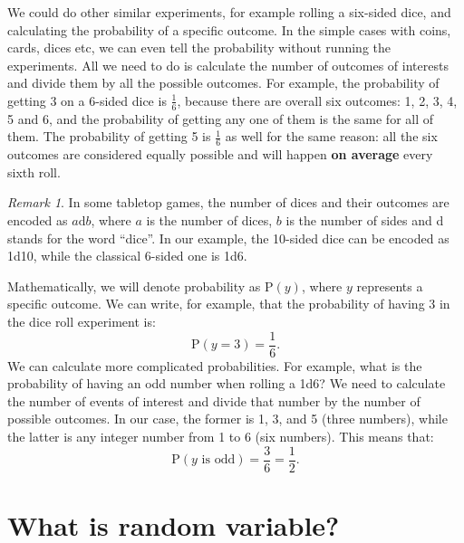 \documentclass[
]{book}
\theoremstyle{definition}
\theoremstyle{definition}
\theoremstyle{definition}
\theoremstyle{definition}
\theoremstyle{remark}
\newtheorem*{remark}{Remark}
\begin{document}
We could do other similar experiments, for example rolling a six-sided dice, and calculating the probability of a specific outcome. In the simple cases with coins, cards, dices etc, we can even tell the probability without running the experiments. All we need to do is calculate the number of outcomes of interests and divide them by all the possible outcomes. For example, the probability of getting 3 on a 6-sided dice is \(\frac{1}{6}\), because there are overall six outcomes: 1, 2, 3, 4, 5 and 6, and the probability of getting any one of them is the same for all of them. The probability of getting 5 is \(\frac{1}{6}\) as well for the same reason: all the six outcomes are considered equally possible and will happen \textbf{on average} every sixth roll.

\begin{remark}
In some tabletop games, the number of dices and their outcomes are encoded as \(a \mathrm{d} b\), where \(a\) is the number of dices, \(b\) is the number of sides and d stands for the word ``dice''. In our example, the 10-sided dice can be encoded as 1d10, while the classical 6-sided one is 1d6.
\end{remark}

Mathematically, we will denote probability as \(\mathrm{P}(y)\), where \(y\) represents a specific outcome. We can write, for example, that the probability of having 3 in the dice roll experiment is:
\begin{equation}
    \mathrm{P}(y=3) = \frac{1}{6} .
    \label{eq:ProbabilityExample01}
\end{equation}
We can calculate more complicated probabilities. For example, what is the probability of having an odd number when rolling a 1d6? We need to calculate the number of events of interest and divide that number by the number of possible outcomes. In our case, the former is 1, 3, and 5 (three numbers), while the latter is any integer number from 1 to 6 (six numbers). This means that:
\begin{equation}
    \mathrm{P}(y \text{ is odd}) = \frac{3}{6} = \frac{1}{2}.
    \label{eq:ProbabilityExample02}
\end{equation}

\hypertarget{whatIsRandomVariable}{%
\section{What is random variable?}\label{whatIsRandomVariable}}
\end{document}

